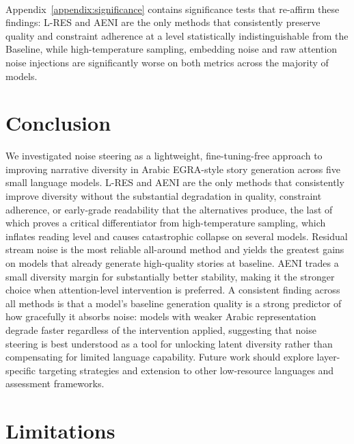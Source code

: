\documentclass[11pt]{article}
\begin{document}
\paragraph{}
Appendix~\ref{appendix:significance} contains significance tests that re-affirm these findings: L-RES and AENI are the only methods that consistently preserve quality and constraint adherence at a level statistically indistinguishable from the Baseline, while high-temperature sampling, embedding noise and raw attention noise injections are significantly worse on both metrics across the majority of models.


\section{Conclusion}

We investigated noise steering as a lightweight, fine-tuning-free approach to improving narrative diversity in Arabic EGRA-style story generation across five small language models. \textsc{L-RES} and \textsc{AENI} are the only methods that consistently improve diversity without the substantial degradation in quality, constraint adherence, or early-grade readability that the alternatives produce, the last of which proves a critical differentiator from high-temperature sampling, which inflates reading level and causes catastrophic collapse on several models. Residual stream noise is the most reliable all-around method and yields the greatest gains on models that already generate high-quality stories at baseline. \textsc{AENI} trades a small diversity margin for substantially better stability, making it the stronger choice when attention-level intervention is preferred. A consistent finding across all methods is that a model's baseline generation quality is a strong predictor of how gracefully it absorbs noise: models with weaker Arabic representation degrade faster regardless of the intervention applied, suggesting that noise steering is best understood as a tool for unlocking latent diversity rather than compensating for limited language capability. Future work should explore layer-specific targeting strategies and extension to other low-resource languages and assessment frameworks.

\section*{Limitations}
\end{document}
